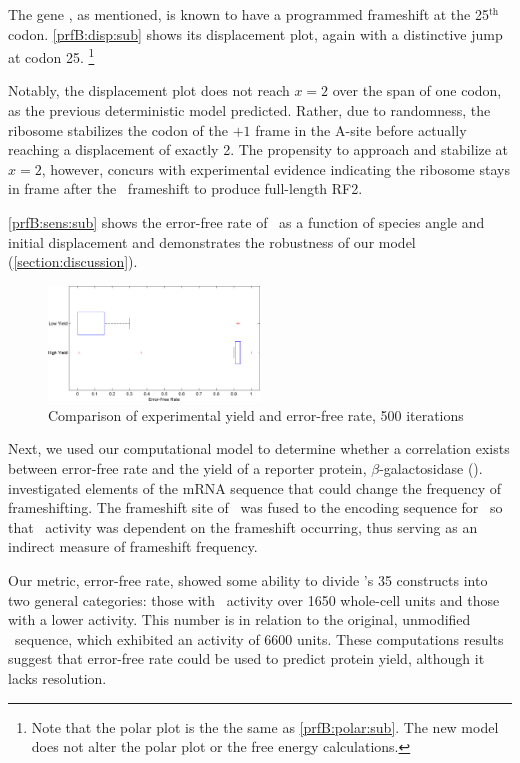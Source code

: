 \documentclass[12pt]{article}
\begin{document}
The gene \prfB, as mentioned, is known
to have a programmed frameshift at the 25$^{\textrm{th}}$ codon.
\autoref{prfB:disp:sub} shows its displacement plot,
again with a distinctive jump at codon 25.
\footnote{Note that the polar plot is the the same as \autoref{prfB:polar:sub}.
The new model does not alter the polar plot or the free energy calculations.}

Notably, the displacement plot does not reach $x=2$ over the span of
one codon, as the previous deterministic model predicted.  Rather, due to randomness, the
ribosome stabilizes the codon of the $+1$ frame in the A-site before actually reaching
a displacement of exactly 2.  The propensity to approach and stabilize at $x=2$,
however, concurs with experimental evidence indicating the ribosome
stays in frame after the \prfB\ frameshift to produce full-length RF2.
  
\autoref{prfB:sens:sub} shows the error-free rate of \prfB\ as a function
of species angle and initial displacement and demonstrates the
robustness of our model (\autoref{section:discussion}).

\begin{figure}
  \caption{Comparison of experimental yield and error-free rate, 500 iterations}
  \label{weissboxplot}
  \includegraphics[width=0.5\textwidth]{histograms/weissbox}
\end{figure}

Next, we used our computational model to determine whether a correlation exists between 
error-free rate and the yield of a reporter protein, $\beta$-galactosidase (\bgals).  
\citet{weiss87} investigated elements of the mRNA sequence that could change the frequency 
of frameshifting.  The frameshift site of \prfB\ was fused to the encoding sequence for 
\bgals\ so that \bgals\ activity was dependent on the frameshift occurring, 
thus serving as an indirect measure of frameshift frequency.  

Our metric, error-free rate, showed some ability to divide \citeauthor{weiss87}'s 35 constructs into 
two general categories: those with \bgals\ activity over 1650 whole-cell units and those with a 
lower activity.  This number is in relation to the original, unmodified \prfB\ sequence, 
which exhibited an activity of 6600 units.  These computations results suggest that 
error-free rate could be used to predict protein yield, although it lacks resolution.
\end{document}
